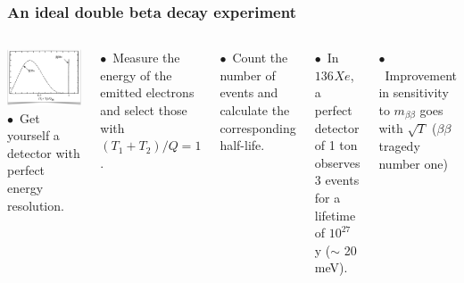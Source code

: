 \begin{frame}
\frametitle{An ideal double beta decay experiment}
\begin{columns}
\includegraphics[scale=0.35]{img/IdealBB2.png}
$\bullet$~Get yourself a detector with perfect energy resolution.

$\bullet$~Measure the energy of the emitted electrons and select those with $(T_1+T_2)/Q = 1$.

$\bullet$~Count the number of events and calculate the corresponding half-life. 

$\bullet$~In ${136}^{}Xe$, a perfect detector of 1 ton observes 3 events for a lifetime of $10^{27}$ y ($\sim$ 20 meV).

$\bullet$~Improvement in sensitivity to $m_{\beta\beta}$ goes with $\sqrt{T}$ ($\beta\beta$ tragedy number one) 
\end{columns}
\end{frame}


